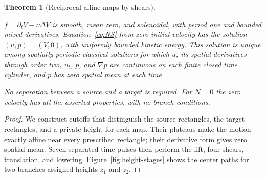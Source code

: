 \documentclass[11pt]{article}
\newtheorem{theorem}{Theorem}[section]
\theoremstyle{remark}
\begin{document}
\begin{theorem}[Reciprocal affine maps by shears]
\begin{enumerate}[label=(\alph*),itemsep=2pt]
$f=\partial_tV-\nu\Delta V$ is smooth, mean zero, and solenoidal, with
period one and bounded mixed derivatives. Equation~\eqref{eq:NS} from
zero initial velocity has the solution $(u,p)=(V,0)$, with uniformly
bounded kinetic energy. This solution is unique among spatially periodic
classical solutions for which $u$, its spatial derivatives through order
two, $u_t$, $p$, and $\nabla p$ are continuous on each finite closed time
cylinder, and $p$ has zero spatial mean at each time.
\end{enumerate}
No separation between a source and a target is required. For $N=0$ the
zero velocity has all the asserted properties, with no branch conditions.
\end{theorem}

\begin{proof}
We construct cutoffs that distinguish the source rectangles, the target
rectangles, and a private height for each map. Their plateaus make the
motion exactly affine near every prescribed rectangle; their derivative
form gives zero spatial mean. Seven separated time pulses then perform
the lift, four shears, translation, and lowering.
Figure~\ref{fig:height-stages} shows the center paths for two branches
assigned heights $z_1$ and $z_2$.


\end{proof}
\end{document}
